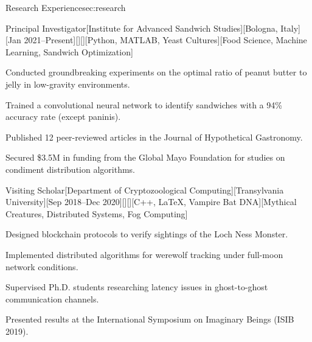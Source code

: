 \documentclass[10pt, letterpaper, extended ]{i-am-developer}
\begin{document}
\begin{devCVSection}{Research Experience}{sec:research}
  \begin{devRole}{Principal Investigator}[Institute for Advanced
    Sandwich Studies][Bologna, Italy][Jan
    2021--Present][\faFlask][\faMapMarker][Python, MATLAB, Yeast
    Cultures][Food Science, Machine Learning, Sandwich Optimization]
    \begin{devItemize}
    \item Conducted groundbreaking experiments on the optimal ratio
      of peanut butter to jelly in low-gravity environments.
    \item Trained a convolutional neural network to identify
      sandwiches with a 94\% accuracy rate (except paninis).
    \item Published 12 peer-reviewed articles in the Journal of
      Hypothetical Gastronomy.
    \item Secured \$3.5M in funding from the Global Mayo Foundation
      for studies on condiment distribution algorithms.
    \end{devItemize}
  \end{devRole}

  \begin{devRole}{Visiting Scholar}[Department of Cryptozoological
    Computing][Transylvania University][Sep 2018--Dec
    2020][\faBook][\faMapMarker][C++, LaTeX, Vampire Bat
    DNA][Mythical Creatures, Distributed Systems, Fog Computing]
    \begin{devItemize}
    \item Designed blockchain protocols to verify sightings of the
      Loch Ness Monster.
    \item Implemented distributed algorithms for werewolf tracking
      under full-moon network conditions.
    \item Supervised Ph.D. students researching latency issues in
      ghost-to-ghost communication channels.
    \item Presented results at the International Symposium on
      Imaginary Beings (ISIB 2019).
    \end{devItemize}
  \end{devRole}


\end{devCVSection}
\end{document}
